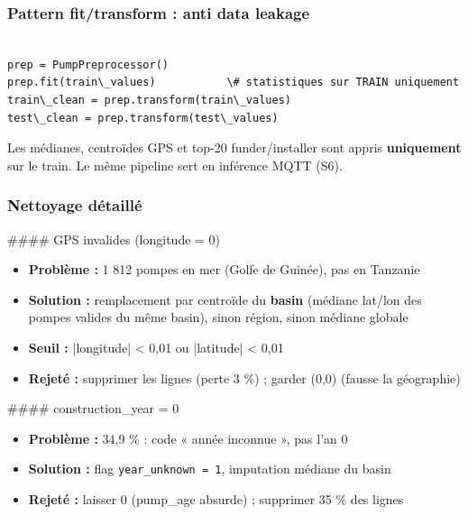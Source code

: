 \documentclass[11pt,a4paper]{report}
\begin{document}
\subsubsection{Pattern fit/transform : anti data leakage}



\begin{lstlisting}

prep = PumpPreprocessor()
prep.fit(train\_values)           \# statistiques sur TRAIN uniquement
train\_clean = prep.transform(train\_values)
test\_clean = prep.transform(test\_values)

\end{lstlisting}



Les médianes, centroïdes GPS et top-20 funder/installer sont appris \textbf{uniquement} sur le train. Le même pipeline sert en inférence MQTT (S6).



\subsubsection{Nettoyage détaillé}



\#\#\#\# GPS invalides (longitude = 0)



\begin{itemize}

\item \textbf{Problème :} 1 812 pompes en mer (Golfe de Guinée), pas en Tanzanie

\item \textbf{Solution :} remplacement par centroïde du \textbf{basin} (médiane lat/lon des pompes valides du même basin), sinon région, sinon médiane globale

\item \textbf{Seuil :} |longitude| < 0,01 ou |latitude| < 0,01

\item \textbf{Rejeté :} supprimer les lignes (perte 3 \%) ; garder (0,0) (fausse la géographie)

\end{itemize}



\#\#\#\# construction\_year = 0



\begin{itemize}

\item \textbf{Problème :} 34,9 \% : code « année inconnue », pas l'an 0

\item \textbf{Solution :} flag \texttt{year\_unknown = 1}, imputation médiane du basin

\item \textbf{Rejeté :} laisser 0 (pump\_age absurde) ; supprimer 35 \% des lignes

\end{itemize}
\end{document}
